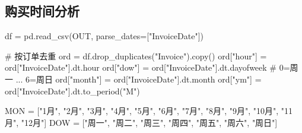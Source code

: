 \documentclass[
]{ctexart}
\newenvironment{Shaded}{\begin{snugshade}}{\end{snugshade}}
\newcommand{\BuiltInTok}[1]{\textcolor[rgb]{0.00,0.23,0.31}{#1}}
\newcommand{\CommentTok}[1]{\textcolor[rgb]{0.37,0.37,0.37}{#1}}
\newcommand{\NormalTok}[1]{\textcolor[rgb]{0.00,0.23,0.31}{#1}}
\newcommand{\OperatorTok}[1]{\textcolor[rgb]{0.37,0.37,0.37}{#1}}
\newcommand{\StringTok}[1]{\textcolor[rgb]{0.13,0.47,0.30}{#1}}
\begin{document}
\subsection{购买时间分析}\label{ux8d2dux4e70ux65f6ux95f4ux5206ux6790}

\begin{Shaded}
\begin{Highlighting}[]
\NormalTok{df }\OperatorTok{=}\NormalTok{ pd.read\_csv(OUT,}
\NormalTok{                 parse\_dates}\OperatorTok{=}\NormalTok{[}\StringTok{"InvoiceDate"}\NormalTok{])}
\end{Highlighting}
\end{Shaded}

\begin{Shaded}
\begin{Highlighting}[]

\CommentTok{\# 按订单去重}
\BuiltInTok{ord} \OperatorTok{=}\NormalTok{ df.drop\_duplicates(}\StringTok{"Invoice"}\NormalTok{).copy()}
\BuiltInTok{ord}\NormalTok{[}\StringTok{"hour"}\NormalTok{] }\OperatorTok{=} \BuiltInTok{ord}\NormalTok{[}\StringTok{"InvoiceDate"}\NormalTok{].dt.hour}
\BuiltInTok{ord}\NormalTok{[}\StringTok{"dow"}\NormalTok{] }\OperatorTok{=} \BuiltInTok{ord}\NormalTok{[}\StringTok{"InvoiceDate"}\NormalTok{].dt.dayofweek          }\CommentTok{\# 0=周一 ... 6=周日}
\BuiltInTok{ord}\NormalTok{[}\StringTok{"month"}\NormalTok{] }\OperatorTok{=} \BuiltInTok{ord}\NormalTok{[}\StringTok{"InvoiceDate"}\NormalTok{].dt.month}
\BuiltInTok{ord}\NormalTok{[}\StringTok{"ym"}\NormalTok{] }\OperatorTok{=} \BuiltInTok{ord}\NormalTok{[}\StringTok{"InvoiceDate"}\NormalTok{].dt.to\_period(}\StringTok{"M"}\NormalTok{)}

\NormalTok{MON }\OperatorTok{=}\NormalTok{ [}\StringTok{"1月"}\NormalTok{, }\StringTok{"2月"}\NormalTok{, }\StringTok{"3月"}\NormalTok{, }\StringTok{"4月"}\NormalTok{, }\StringTok{"5月"}\NormalTok{, }\StringTok{"6月"}\NormalTok{, }\StringTok{"7月"}\NormalTok{, }\StringTok{"8月"}\NormalTok{, }\StringTok{"9月"}\NormalTok{, }\StringTok{"10月"}\NormalTok{, }\StringTok{"11月"}\NormalTok{, }\StringTok{"12月"}\NormalTok{]}
\NormalTok{DOW }\OperatorTok{=}\NormalTok{ [}\StringTok{"周一"}\NormalTok{, }\StringTok{"周二"}\NormalTok{, }\StringTok{"周三"}\NormalTok{, }\StringTok{"周四"}\NormalTok{, }\StringTok{"周五"}\NormalTok{, }\StringTok{"周六"}\NormalTok{, }\StringTok{"周日"}\NormalTok{]}


\end{Highlighting}
\end{Shaded}
\end{document}
